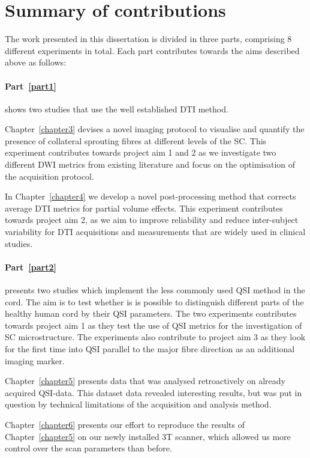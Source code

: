 \section{Summary of contributions}
The work presented in this dissertation is divided in three parts, comprising 8 different experiments in total. Each part contributes towards the aims described above as follows: 

\paragraph{Part~\ref{part1}} shows two studies that use the well established \gls{DTI} method. 


Chapter~\ref{chapter3} devises a novel imaging protocol to visualise and quantify the presence of collateral sprouting fibres at different levels of the \gls{SC}. This experiment contributes towards project aim 1 and 2 as we investigate two different \gls{DWI} metrics from existing literature and focus on the optimisation of the acquisition protocol.

In Chapter~\ref{chapter4} we develop a novel post-processing method that corrects average \gls{DTI} metrics for partial volume effects. This experiment contributes towards project aim 2, as we aim to improve reliability and reduce inter-subject variability for \gls{DTI} acquisitions and measurements that are widely used in clinical studies. 

\paragraph{Part~\ref{part2}} presents two studies which implement the less commonly used \gls{QSI} method in the cord. The aim is to test whether is is possible to distinguish different parts of the healthy human cord by their \gls{QSI} parameters. The two  experiments contributes towards project aim 1 as they test the use of \gls{QSI} metrics for the investigation of \gls{SC} microstructure. The experiments also contribute to project aim 3 as they look for the first time into \gls{QSI} parallel to the major fibre direction as an additional imaging marker.

Chapter~\ref{chapter5} presents data that was analysed retroactively on already acquired QSI-data. This dataset data revealed interesting results, but was put in question by technical limitations of the acquisition and analysis method. 

Chapter~\ref{chapter6} presents our effort to reproduce the results of Chapter~\ref{chapter5} on our newly installed 3T scanner, which allowed us more control over the scan parameters than before. 


